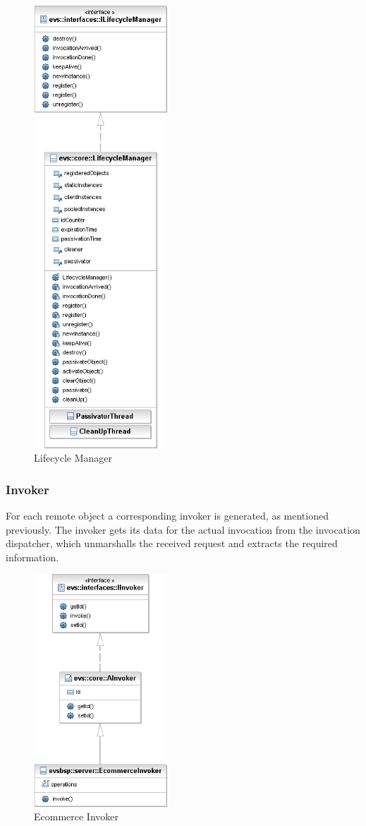 \begin{figure}[ht!]
	\centering\includegraphics[width=5cm]{uml/LifeCycleManager.jpg} 
	\caption{Lifecycle Manager}
	\label{fig:lifecycle}
\end{figure}


\subsubsection{Invoker}
For each remote object a corresponding invoker is generated, as mentioned previously. The invoker gets its data for the actual invocation from the invocation dispatcher, which unmarshalls the received request and extracts the required information.

\begin{figure}[ht!]
	\centering\includegraphics[width=5cm]{uml/EcommerceInvoker.jpg} 
	\caption{Ecommerce Invoker}
	\label{fig:invoker}
\end{figure}

